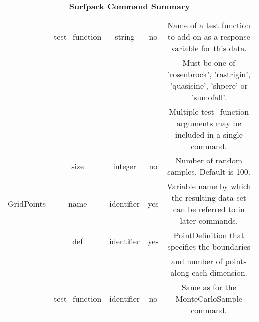 \documentclass{article}
\begin{document}
\begin{sidewaystable}[h]
\begin{tabular}{|c|c|c|c|c|}
    \hline
    & test\_function & string & no & Name of a test function to add on
    as a response variable for this data.\\
    & & & & Must be one of 'rosenbrock', 'rastrigin', 'quasisine',
    'shpere' or 'sumofall'.\\
    & & & & Multiple test\_function arguments may be included in a
    single command.\\
    \hline
    & size & integer & no & Number of random samples.  Default is
    100.\\
    \hline
    GridPoints & name & identifier & yes & Variable name by which the
    resulting data set can be referred to in later commands.\\
    \hline
    & def & identifier & yes & PointDefinition that specifies the
    boundaries\\
    & & & & and number of points along each dimension.\\
    \hline
    & test\_function & identifier & no & Same as for the
    MonteCarloSample command.\\
    \hline
  \end{tabular}
  \caption{\textbf{Surfpack Command Summary}}
\end{sidewaystable}
\end{document}
